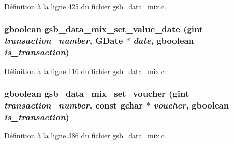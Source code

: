 Définition à la ligne 425 du fichier gsb\_\-data\_\-mix.c.

\subsubsection[{gsb\_\-data\_\-mix\_\-set\_\-value\_\-date}]{\setlength{\rightskip}{0pt plus 5cm}gboolean gsb\_\-data\_\-mix\_\-set\_\-value\_\-date (gint {\em transaction\_\-number}, \/  GDate $\ast$ {\em date}, \/  gboolean {\em is\_\-transaction})}\label{gsb__data__mix_8c_acf0d9be87925bf822e6f46187703353e}


Définition à la ligne 116 du fichier gsb\_\-data\_\-mix.c.

\subsubsection[{gsb\_\-data\_\-mix\_\-set\_\-voucher}]{\setlength{\rightskip}{0pt plus 5cm}gboolean gsb\_\-data\_\-mix\_\-set\_\-voucher (gint {\em transaction\_\-number}, \/  const gchar $\ast$ {\em voucher}, \/  gboolean {\em is\_\-transaction})}\label{gsb__data__mix_8c_a5277046f76b6bc872ef6c9df7b9fb6ca}


Définition à la ligne 386 du fichier gsb\_\-data\_\-mix.c.

